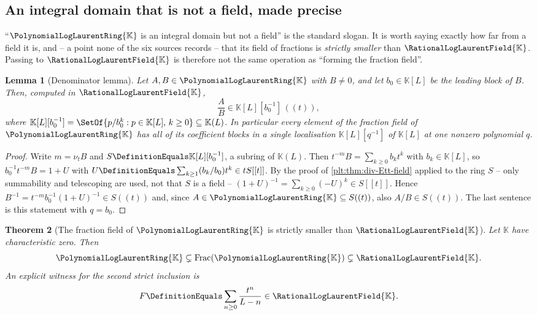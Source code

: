 \documentclass[11pt,oneside]{article}
\theoremstyle{plain}
\newtheorem{theorem}{Theorem}[section]
\newtheorem{lemma}[theorem]{Lemma}
\theoremstyle{definition}
\theoremstyle{remark}
\newcommand{\K}{\mathbb{K}}
\newcommand{\PLlau}{\PolynomialLogLaurentRing{\K}}       %
\newcommand{\PLrat}{\RationalLogLaurentField{\K}}        %
\newcommand{\ordt}{\nu_{t}}                              %
\begin{document}
\subsection{An integral domain that is not a field, made precise}
\label{plt:sec:div-domain}

``\(\PLlau\) is an integral domain but not a field'' is the standard slogan.
It is worth saying exactly how far from a field it is, and -- a point none of
the six sources records -- that its field of fractions is \emph{strictly
smaller} than \(\PLrat\).  Passing to \(\PLrat\) is therefore not the same
operation as ``forming the fraction field''.

\begin{lemma}[Denominator lemma]\label{plt:lem:div-denominator}
Let \(A,B\in\PLlau\) with \(B\ne0\), and let \(b_{0}\in\K[L]\) be the leading
block of \(B\).  Then, computed in \(\PLrat\),
\begin{equation}\label{plt:eq:div-denominator}
  \frac AB\in\K[L][b_{0}^{-1}]\,((t)),
\end{equation}
where \(\K[L][b_{0}^{-1}]=\SetOf{p/b_{0}^{k}:p\in\K[L],\,k\ge0}\subseteq\K(L)\).
In particular every element of the fraction field of \(\PLlau\) has all of its
coefficient blocks in a \emph{single} localisation \(\K[L][q^{-1}]\) of
\(\K[L]\) at one nonzero polynomial \(q\).
\end{lemma}

\begin{proof}
Write \(m=\ordt B\) and \(S\DefinitionEquals\K[L][b_{0}^{-1}]\), a subring of
\(\K(L)\).  Then \(t^{-m}B=\sum_{k\ge0}b_{k}t^{k}\) with \(b_{k}\in\K[L]\), so
\(b_{0}^{-1}t^{-m}B=1+U\) with \(U\DefinitionEquals\sum_{k\ge1}(b_{k}/b_{0})
t^{k}\in tS[[t]]\).  By the proof of \cref{plt:thm:div-Ett-field} applied to
the ring \(S\) -- only summability and telescoping are used, not that \(S\) is
a field -- \((1+U)^{-1}=\sum_{k\ge0}(-U)^{k}\in S[[t]]\).  Hence
\(B^{-1}=t^{-m}b_{0}^{-1}(1+U)^{-1}\in S((t))\) and, since
\(A\in\PLlau\subseteq S((t))\), also \(A/B\in S((t))\).  The last sentence is
this statement with \(q=b_{0}\).
\end{proof}

\begin{theorem}[The fraction field of \(\PLlau\) is strictly smaller than
\(\PLrat\)]\label{plt:thm:div-frac-strict}
Let \(\K\) have characteristic zero.  Then
\begin{equation}\label{plt:eq:div-frac-strict}
  \PLlau\subsetneq\operatorname{Frac}(\PLlau)\subsetneq\PLrat .
\end{equation}
An explicit witness for the second strict inclusion is
\begin{equation}\label{plt:eq:div-frac-witness}
  F\DefinitionEquals\sum_{n\ge0}\frac{t^{n}}{L-n}\in\PLrat .
\end{equation}
\end{theorem}
\end{document}

